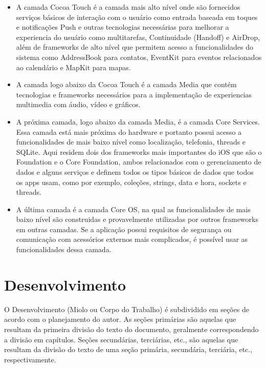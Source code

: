 \begin{itemize}

	\item A camada Cocoa Touch é a camada mais alto nível onde são fornecidos serviços básicos de interação 
    com o usuário como entrada baseada em toques e notificações Push e outras tecnologias necessárias para
     melhorar a experiencia do usuário como multitarefas, Continuidade (Handoff) e AirDrop, além de frameworks 
     de alto nível que permitem acesso a funcionalidades do sistema como AddressBook para contatos, EventKit 
     para eventos relacionados ao calendário e MapKit para mapas.
	\item A camada logo abaixo da Cocoa Touch é a camada Media que contém tecnologias e frameworks necessários 
    para a implementação de experiencias multimedia com áudio, vídeo e gráficos.
	\item A próxima camada, logo abaixo da camada Media, é a camada Core Services. Essa camada está mais próxima 
    do hardware e portanto possui acesso a funcionalidades de mais baixo nível como localização, telefonia, threads 
    e SQLite. Aqui residem dois dos frameworks mais importantes do iOS que são o Foundation e o Core Foundation, 
    ambos relacionados com o gerenciamento de dados e alguns serviços e definem todos os tipos básicos de dados que 
    todos os apps usam, como por exemplo, coleções, strings, data e hora, sockets e threads.
	\item A última camada é a camada Core OS, na qual as funcionalidades de mais baixo nível são construidas e 
    provavelmente utilizadas por outros frameworks em outras camadas. Se a aplicação possui requisitos de segurança 
    ou comunicação com acessórios externos mais complicados, é possível usar as funcionalidades dessa camada.

\end{itemize}



\section{Desenvolvimento}

O Desenvolvimento (Miolo ou Corpo do Trabalho) é subdividido em seções de 
acordo com o planejamento do autor. As seções primárias são aquelas que 
resultam da primeira divisão do texto do documento, geralmente 
correspondendo a divisão em capítulos. Seções secundárias, terciárias, 
etc., são aquelas que resultam da divisão do texto de uma seção primária, 
secundária, terciária, etc., respectivamente.

